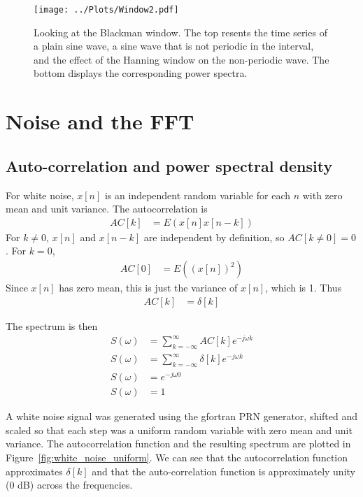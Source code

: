 \documentclass[twocolumn]{myarticle}
\begin{document}
\begin{figure*}[htb]
    \centering
    \texttt{[image: ../Plots/Window2.pdf]}
    \caption{%
        Looking at the Blackman window. The top resents the time series of a plain sine wave, a sine wave that is not periodic in the interval, and the effect of the Hanning window on the non-periodic wave. The bottom displays the corresponding power spectra.
    }
    \label{fig:Window2}
\end{figure*}

\section{Noise and the FFT}
\label{sec:noise_and_the_fft}

\subsection{Auto-correlation and power spectral density}
\label{subsec:auto_correlation_and_power_spectral_density}

For white noise, $ x[n] $ is an independent random variable for each $ n $ with zero mean and unit variance.
The autocorrelation is
\begin{align}
    AC[k] &= E \left( x[n] x[n-k] \right)
\end{align}
For $ k \neq 0 $, $ x[n] $ and $ x[n-k] $ are independent by definition, so $ AC[k \neq 0] = 0 $.
For $ k = 0 $,
\begin{align}
    AC[0] &= E \left( (x[n])^2 \right)
\end{align}
Since $ x[n] $ has zero mean, this is just the variance of $ x[n] $, which is 1.
Thus
\begin{align}
    AC[k] &= \delta[k]
\end{align}

The spectrum is then
\begin{align}
    S(\omega) &= \sum_{k = -\infty}^{\infty} AC[k] e^{-j \omega k}
    \\
    S(\omega) &= \sum_{k = -\infty}^{\infty} \delta[k] e^{-j \omega k}
    \\
    S(\omega) &= e^{-j \omega 0}
    \\
    S(\omega) &= 1
\end{align}

A white noise signal was generated using the gfortran PRN generator, shifted and scaled so that each step was a uniform random variable with zero mean and unit variance.
The autocorrelation function and the resulting spectrum are plotted in Figure~\ref{fig:white_noise_uniform}.
We can see that the autocorrelation function approximates $ \delta[k] $ and that the auto-correlation function is approximately unity (0 dB) across the frequencies.
\end{document}
